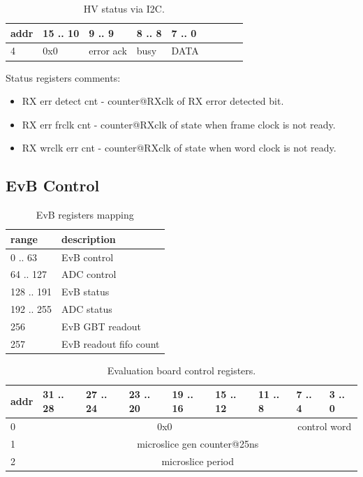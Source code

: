 \documentclass{article}
\begin{document}
\begin{table}[H]
\centering
\begin{tabular}{| l | l | l | l | l | l | l | l | l |}
\hline
addr & 15 .. 10 & 9 .. 9 & 8 .. 8 & 7 .. 0 \\ \hline
4 & 0x0 & error ack & busy & DATA \\ \hline
\end{tabular}
\caption{HV status via I2C.\label{tab9}}
\end{table}

Status registers comments:
\begin{itemize}
\item RX err detect cnt - counter@RXclk of RX error detected bit.

\item RX err frclk cnt - counter@RXclk of state when frame clock is not ready.

\item RX wrclk err cnt - counter@RXclk of state when word clock is not ready.
\end{itemize}















\subsection{EvB Control}

\begin{table}[H]
\centering
\begin{tabular}{| l | l |}
\hline
range & description \\ \hline
0 .. 63 & EvB control \\ \hline
64 .. 127 & ADC control \\ \hline
128 .. 191 & EvB status \\ \hline
192 .. 255 & ADC status \\ \hline
256 & EvB GBT readout \\ \hline
257 & EvB readout fifo count \\ \hline
\end{tabular}
\caption{EvB registers mapping\label{tab6}}
\end{table}

\begin{table}[H]
\centering
\begin{tabular}{| l | l | l | l | l | l | l | l | l |}
\hline
addr & 31 .. 28 & 27 .. 24 & 23 .. 20 & 19 .. 16 & 15 .. 12 & 11 .. 8 & 7 .. 4 & 3 .. 0 \\ \hline
0 & \multicolumn{6}{c|}{0x0}  & \multicolumn{2}{c|}{control word} \\ \hline
1 & \multicolumn{8}{c|}{microslice gen counter@25ns}  \\ \hline
2 & \multicolumn{8}{c|}{microslice period}  \\ \hline
\end{tabular}
\caption{Evaluation board control registers.\label{tab11}}
\end{table}
\end{document}
